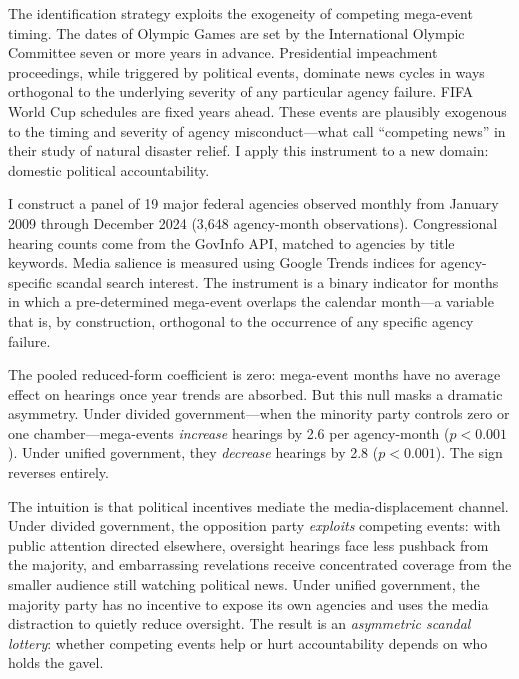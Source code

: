 \documentclass[12pt]{article}
\begin{document}
The identification strategy exploits the exogeneity of competing mega-event timing. The dates of Olympic Games are set by the International Olympic Committee seven or more years in advance. Presidential impeachment proceedings, while triggered by political events, dominate news cycles in ways orthogonal to the underlying severity of any particular agency failure. FIFA World Cup schedules are fixed years ahead. These events are plausibly exogenous to the timing and severity of agency misconduct---what \citet{eisensee2007news} call ``competing news'' in their study of natural disaster relief. I apply this instrument to a new domain: domestic political accountability.

I construct a panel of 19 major federal agencies observed monthly from January 2009 through December 2024 (3,648 agency-month observations). Congressional hearing counts come from the GovInfo API, matched to agencies by title keywords. Media salience is measured using Google Trends indices for agency-specific scandal search interest. The instrument is a binary indicator for months in which a pre-determined mega-event overlaps the calendar month---a variable that is, by construction, orthogonal to the occurrence of any specific agency failure.

The pooled reduced-form coefficient is zero: mega-event months have no average effect on hearings once year trends are absorbed. But this null masks a dramatic asymmetry. Under divided government---when the minority party controls zero or one chamber---mega-events \textit{increase} hearings by 2.6 per agency-month ($p < 0.001$). Under unified government, they \textit{decrease} hearings by 2.8 ($p < 0.001$). The sign reverses entirely.

The intuition is that political incentives mediate the media-displacement channel. Under divided government, the opposition party \textit{exploits} competing events: with public attention directed elsewhere, oversight hearings face less pushback from the majority, and embarrassing revelations receive concentrated coverage from the smaller audience still watching political news. Under unified government, the majority party has no incentive to expose its own agencies and uses the media distraction to quietly reduce oversight. The result is an \textit{asymmetric scandal lottery}: whether competing events help or hurt accountability depends on who holds the gavel.
\end{document}
